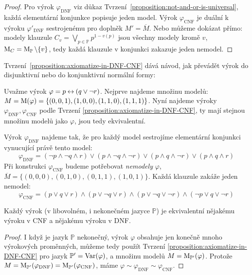 \begin{proof}
    Pro výrok $\varphi_{\mathrm{DNF}}$ viz důkaz Tvrzení~\ref{proposition:not-and-or-is-universal}, každá elementární konjunkce popisuje jeden model. Výrok $\varphi_{\mathrm{CNF}}$ je duální k výroku $\varphi'_{\mathrm{DNF}}$ sestrojenému pro doplněk $M'=\overline{M}$. Nebo můžeme dokázat přímo: modely klauzule $C_v=\bigvee_{p\in\mathbb P}p^{1-v(p)}$ jsou všechny modely kromě $v$, $\operatorname{M}_C=\operatorname{M}_\mathbb P\setminus\{v\}$, tedy každá klauzule v konjunkci zakazuje jeden nemodel.
\end{proof}

Tvrzení~\ref{proposition:axiomatize-in-DNF-CNF} dává návod, jak převádět výrok do disjunktivní nebo do konjunktivní normální formy:

\begin{example}
    Uvažme výrok $\varphi=p\mathbin{\leftrightarrow} (q\lor \neg r)$. Nejprve najdeme množinu modelů: $M=\operatorname{M}(\varphi)=\{(0,0,1),(1,0,0),(1,1,0),(1,1,1)\}$. Nyní najdeme výroky $\varphi_{\mathrm{DNF}},\varphi_{\mathrm{CNF}}$ podle Tvrzení \ref{proposition:axiomatize-in-DNF-CNF}, ty mají stejnou množinu modelů jako $\varphi$, jsou tedy ekvivalentní.

    Výrok $\varphi_{\mathrm{DNF}}$ najdeme tak, že pro každý model sestrojíme elementární konjunkci vynucující právě tento model:
    $$
    \varphi_{\mathrm{DNF}}=(\neg p\land\neg q\land r)\lor (p\land\neg q\land\neg r) \lor (p\land q\land\neg r)\lor (p\land q\land r)
    $$
    Při konstrukci $\varphi_{\mathrm{CNF}}$ budeme potřebovat \emph{nemodely} $\varphi$, $\overline{M}=\{(0,0,0),(0,1,0),(0,1,1),(1,0,1)\}$. Každá klauzule zakáže jeden nemodel:
    $$
    \varphi_{\mathrm{CNF}}=(p\lor q\lor r)\land (p\lor\neg q\lor r) \land (p\lor \neg q\lor\neg r)\land (\neg p\lor q\lor\neg r)
    $$
\end{example}

\begin{corollary}
    Každý výrok (v libovolném, i nekonečném jazyce $\mathbb P$) je ekvivalentní nějakému výroku v CNF a nějakému výroku v DNF.
\end{corollary}
\begin{proof}
I když je jazyk $\mathbb P$ nekonečný, výrok $\varphi$ obsahuje jen konečně mnoho výrokových proměnných, můžeme tedy použít Tvrzení \ref{proposition:axiomatize-in-DNF-CNF} pro jazyk $\mathbb P'=\operatorname{Var}(\varphi)$, a množinu modelů $M=\operatorname{M}_{\mathbb P'}(\varphi)$. Protože $M=\operatorname{M}_{\mathbb P'}(\varphi_{\mathrm{DNF}})=\operatorname{M}_{\mathbb P'}(\varphi_{\mathrm{CNF}})$, máme $\varphi\sim\varphi_{\mathrm{DNF}}\sim\varphi_{\mathrm{CNF}}$.
\end{proof}

